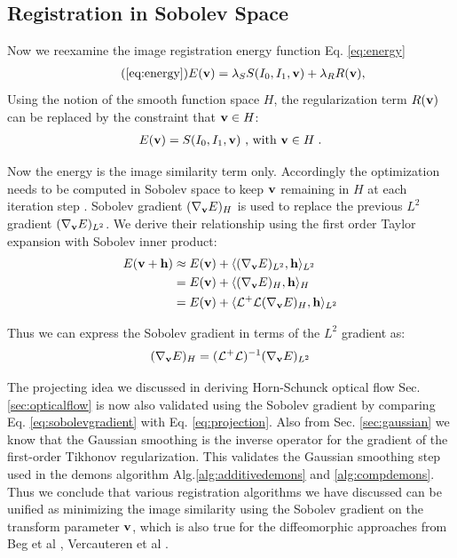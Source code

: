 \documentclass[letterpaper,12pt]{article}
\begin{document}
\subsection{Registration in Sobolev Space}

Now we reexamine the image registration energy function Eq. \ref{eq:energy}
\begin{align}
\tag{\ref{eq:energy}}
\myE(\v) = \lambda_S \myS(\I_0,\I_1,\v) + \lambda_R \myR(\v),
\end{align}
Using the notion of the smooth function space $H$, the regularization term $R(\mathbf{v})$ can be replaced by the constraint that $\mathbf{v} \in H$:
\begin{align}
\label{eq:sobolevenergy}
E(\mathbf{v}) = S(I_0,I_1,\mathbf{v}) \text{  , with }  \mathbf{v} \in H \; .
\end{align}

Now the energy is the image similarity term only. Accordingly the optimization needs to be computed in Sobolev space to keep $\mathbf{v}$ remaining in $H$ at each iteration step . Sobolev gradient $(\nabla_{\mathbf{v}} E)_H$ is used to replace the previous $L^2$ gradient $(\nabla_{\mathbf{v}} E)_{L^2}$. We derive their relationship using the first order Taylor expansion with Sobolev inner product:
\begin{equation}
\begin{split}
E(\mathbf{v} + \mathbf{h}) 
& \approx E(\mathbf{v}) + \langle (\nabla_{\mathbf{v}}E)_{L^2} , \mathbf{h} \rangle_{L^2} 
\\
& = E(\mathbf{v}) + \langle (\nabla_{\mathbf{v}}E)_{H} , \mathbf{h} \rangle_H
\\
& = E(\mathbf{v}) + \langle \mathcal{L}^+\mathcal{L} (\nabla_{\mathbf{v}}E)_{H}  , \mathbf{h} \rangle_{L^2}
\end{split}
\end{equation}

Thus we can express the Sobolev gradient in terms of the $L^2$ gradient as:
\begin{align}
\label{eq:sobolevgradient}
(\nabla_{\mathbf{v}}E)_{H} = (\mathcal{L}^+\mathcal{L})^{-1} (\nabla_{\mathbf{v}}E)_{L^2}
\end{align}

The projecting idea we discussed in deriving Horn-Schunck optical flow Sec. \ref{sec:opticalflow} is now also validated using the Sobolev gradient by comparing Eq. \ref{eq:sobolevgradient} with Eq. \ref{eq:projection}. Also from Sec. \ref{sec:gaussian} we know that the Gaussian smoothing is the inverse operator for the gradient of the first-order Tikhonov regularization. This validates the Gaussian smoothing step used in the demons algorithm Alg.\ref{alg:additivedemons} and \ref{alg:compdemons}. Thus we conclude that various registration algorithms we have discussed can be unified as minimizing the image similarity using the Sobolev gradient on the transform parameter $\mathbf{v}$, which is also true for the diffeomorphic approaches from Beg et al \cite{Beg2005Computing}, Vercauteren et al \cite{Vercauteren2007, Vercauteren2008Symmetric}.
\end{document}
